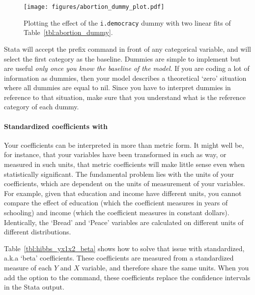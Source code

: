 	\begin{figure}[htp]
		\texttt{[image: figures/abortion\_dummy\_plot.pdf]}

		\caption[Plotting the effect of a dummy]{\label{fig:abortion_dummy_plot}
		Plotting the effect of the \texttt{i.democracy} dummy with two linear fits of Table~\ref{tbl:abortion_dummy}.\\
		}
	\end{figure}%

	Stata will accept the  prefix command in front of any categorical variable, and will select the first category as the baseline. Dummies are simple to implement but are useful \emph{only once you know the baseline of the model}. If you are coding a lot of information as dummies, then your model describes a theoretical `zero' situation where all dummies are equal to nil. Since you have to interpret dummies in reference to that situation, make sure that you understand what is the reference category of each dummy.

  
	\paragraph{Standardized coefficients with }%
	\label{sec:beta}%
	Your coefficients can be interpreted in more than metric form. It might well be, for instance, that your variables have been transformed in such as way, or measured in such units, that metric coefficients will make little sense even when statistically significant. The fundamental problem lies with the units of your coefficients, which are dependent on the units of measurement of your variables. For example, given that education and income have different units, you cannot compare the effect of education (which the coefficient measures in years of schooling) and income (which the coefficient measures in constant dollars). Identically, the `Bread' and `Peace' variables are calculated on different units of different distributions.
	
	Table~\ref{tbl:hibbs_yx1x2_beta} shows how to solve that issue with standardized, a.k.a `beta' coefficients. These coefficients are measured from a standardized measure of each $Y$ and $X$ variable, and therefore share the same units. When you add the  option to the  command, these coefficients replace the confidence intervals in the Stata output.

